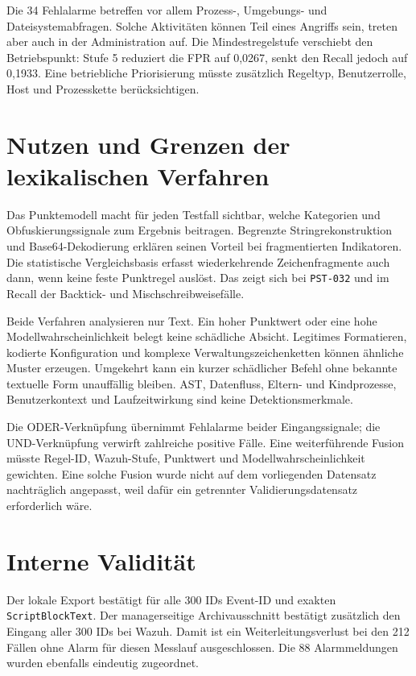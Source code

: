 \documentclass[12pt,a4paper,oneside,parskip=half]{scrreprt}
\begin{document}
Die 34 Fehlalarme betreffen vor allem Prozess-, Umgebungs- und Dateisystemabfragen. Solche Aktivitäten können Teil eines Angriffs sein, treten aber auch in der Administration auf. Die Mindestregelstufe verschiebt den Betriebspunkt: Stufe 5 reduziert die FPR auf 0{,}0267, senkt den Recall jedoch auf 0{,}1933. Eine betriebliche Priorisierung müsste zusätzlich Regeltyp, Benutzerrolle, Host und Prozesskette berücksichtigen.

\section{Nutzen und Grenzen der lexikalischen Verfahren}
Das Punktemodell macht für jeden Testfall sichtbar, welche Kategorien und Obfuskierungssignale zum Ergebnis beitragen. Begrenzte Stringrekonstruktion und Base64-Dekodierung erklären seinen Vorteil bei fragmentierten Indikatoren. Die statistische Vergleichsbasis erfasst wiederkehrende Zeichenfragmente auch dann, wenn keine feste Punktregel auslöst. Das zeigt sich bei \texttt{PST-032} und im Recall der Backtick- und Mischschreibweisefälle.

Beide Verfahren analysieren nur Text. Ein hoher Punktwert oder eine hohe Modellwahrscheinlichkeit belegt keine schädliche Absicht. Legitimes Formatieren, kodierte Konfiguration und komplexe Verwaltungszeichenketten können ähnliche Muster erzeugen. Umgekehrt kann ein kurzer schädlicher Befehl ohne bekannte textuelle Form unauffällig bleiben. AST, Datenfluss, Eltern- und Kindprozesse, Benutzerkontext und Laufzeitwirkung sind keine Detektionsmerkmale.

Die ODER-Verknüpfung übernimmt Fehlalarme beider Eingangssignale; die UND-Verknüpfung verwirft zahlreiche positive Fälle. Eine weiterführende Fusion müsste Regel-ID, Wazuh-Stufe, Punktwert und Modellwahrscheinlichkeit gewichten. Eine solche Fusion wurde nicht auf dem vorliegenden Datensatz nachträglich angepasst, weil dafür ein getrennter Validierungsdatensatz erforderlich wäre.
\section{Interne Validität}

Der lokale Export bestätigt für alle 300 IDs Event-ID und exakten \texttt{ScriptBlockText}. Der managerseitige Archivausschnitt bestätigt zusätzlich den Eingang aller 300 IDs bei Wazuh. Damit ist ein Weiterleitungsverlust bei den 212 Fällen ohne Alarm für diesen Messlauf ausgeschlossen. Die 88 Alarmmeldungen wurden ebenfalls eindeutig zugeordnet.
\end{document}
